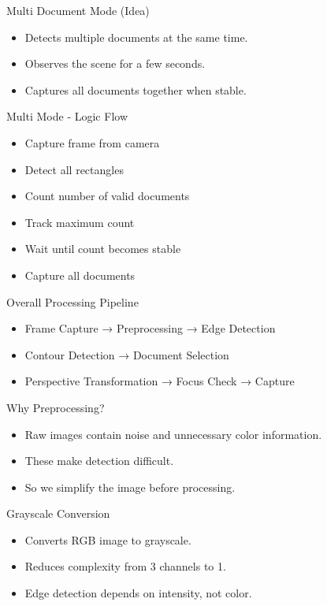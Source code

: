 \documentclass{beamer}
\begin{document}
\begin{frame}{Multi Document Mode (Idea)}
\begin{itemize}
\item Detects multiple documents at the same time.
\item Observes the scene for a few seconds.
\item Captures all documents together when stable.
\end{itemize}
\end{frame}

\begin{frame}{Multi Mode - Logic Flow}
\begin{itemize}
\item Capture frame from camera
\item Detect all rectangles
\item Count number of valid documents
\item Track maximum count
\item Wait until count becomes stable
\item Capture all documents
\end{itemize}
\end{frame}

\begin{frame}{Overall Processing Pipeline}
\begin{itemize}
\item Frame Capture → Preprocessing → Edge Detection
\item Contour Detection → Document Selection
\item Perspective Transformation → Focus Check → Capture
\end{itemize}
\end{frame}

\begin{frame}{Why Preprocessing?}
\begin{itemize}
\item Raw images contain noise and unnecessary color information.
\item These make detection difficult.
\item So we simplify the image before processing.
\end{itemize}
\end{frame}

\begin{frame}{Grayscale Conversion}
\begin{itemize}
\item Converts RGB image to grayscale.
\item Reduces complexity from 3 channels to 1.
\item Edge detection depends on intensity, not color.
\end{itemize}
\end{frame}
\end{document}
